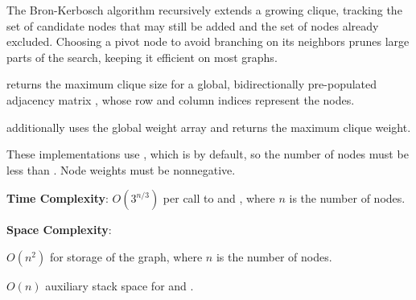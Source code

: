 The Bron-Kerbosch algorithm recursively extends a growing clique, tracking the set of candidate nodes that may still be added and the set of nodes already excluded. Choosing a pivot node to avoid branching on its neighbors prunes large parts of the search, keeping it efficient on most graphs.

\begin{compactitem}
  \item {} returns the maximum clique size for a global, bidirectionally pre-populated adjacency matrix , whose row and column indices represent the nodes.
  \item {} additionally uses the global weight array  and returns the maximum clique weight.
\end{compactitem}

These implementations use , which is  by default, so the number of nodes must be less than . Node weights must be nonnegative.

\textbf{Time Complexity}: $O(3^{n/3})$ per call to  and , where $n$ is the number of nodes.

\textbf{Space Complexity}:
\begin{compactitem}
  \item $O(n^{2})$ for storage of the graph, where $n$ is the number of nodes.
  \item $O(n)$ auxiliary stack space for  and .
\end{compactitem}

